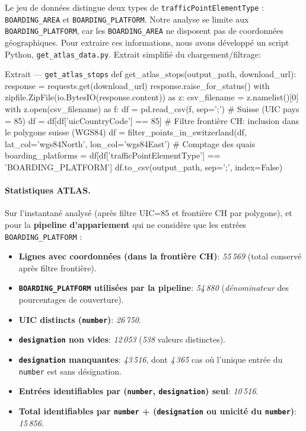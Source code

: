 Le jeu de données distingue deux types de \texttt{trafficPointElementType} : \texttt{BOARDING\_AREA} et \texttt{BOARDING\_PLATFORM}. Notre analyse se limite aux \texttt{BOARDING\_PLATFORM}, car les \texttt{BOARDING\_AREA} ne disposent pas de coordonnées géographiques. Pour extraire ces informations, nous avons développé un script Python, \texttt{get\_atlas\_data.py}. Extrait simplifié du chargement/filtrage:

\begin{codebox}[language=Python]{Extrait — \texttt{get\_atlas\_stops}}
def get_atlas_stops(output_path, download_url):
    response = requests.get(download_url)
    response.raise_for_status()
    with zipfile.ZipFile(io.BytesIO(response.content)) as z:
        csv_filename = z.namelist()[0]
        with z.open(csv_filename) as f:
            df = pd.read_csv(f, sep=';')
            # Suisse (UIC pays = 85)
            df = df[df['uicCountryCode'] == 85]
            # Filtre frontière CH: inclusion dans le polygone suisse (WGS84)
            df = filter_points_in_switzerland(df, lat_col='wgs84North', lon_col='wgs84East')
            # Comptage des quais
            boarding_platforms = df[df['trafficPointElementType'] == 'BOARDING_PLATFORM']
            df.to_csv(output_path, sep=';', index=False)
\end{codebox}


\paragraph{Statistiques ATLAS.} Sur l'instantané analysé (après filtre UIC=85 et frontière CH par polygone), et pour la \textbf{pipeline d'appariement} qui ne considère que les entrées \texttt{BOARDING\_PLATFORM} :
\begin{itemize}
  \item \textbf{Lignes avec coordonnées (dans la frontière CH)}: \textit{55\,569} (total conservé après filtre frontière).
  \item \textbf{\texttt{BOARDING\_PLATFORM} utilisées par la pipeline}: \textit{54\,880} (\emph{dénominateur} des pourcentages de couverture).
  \item \textbf{UIC distincts (\texttt{number})}: \textit{26\,750}.
  \item \textbf{\texttt{designation} non vides}: \textit{12\,053} (\textit{538} valeurs distinctes).
  \item \textbf{\texttt{designation} manquantes}: \textit{43\,516}, dont \textit{4\,365} cas où l'unique entrée du \texttt{number} est sans désignation.
  \item \textbf{Entrées identifiables par (\texttt{number}, \texttt{designation}) seul}: \textit{10\,516}.
  \item \textbf{Total identifiables par \texttt{number} + (\texttt{designation} ou unicité du \texttt{number})}: \textit{15\,856}.
\end{itemize}

